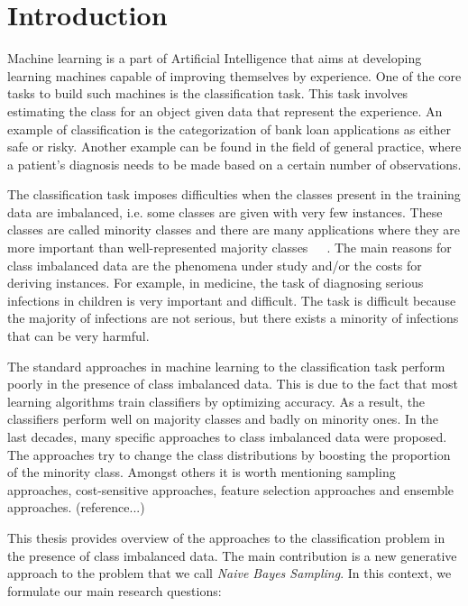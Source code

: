 \chapter{Introduction}\label{Intro}
Machine learning is a part of Artificial Intelligence that aims at developing learning machines capable of improving themselves by experience. One of the core tasks to build such machines is the classification task. This task involves estimating the class for an object given data that represent the experience.
 An example of classification is the categorization of bank loan applications as either safe or risky. Another example can be found in the field of general practice, where a patient's diagnosis needs to be made based on a certain number of observations.

The classification task imposes difficulties when the classes present in the training data are imbalanced, i.e. some classes are given with very few instances. These classes are called minority classes and there are many applications where they are more important than well-represented majority classes~\cite{miningwith04}~\cite{Drummond05Severe}~\cite{Japkowicz02classimbalance}. The main reasons for class imbalanced data are the phenomena under study and/or the costs for deriving instances.  For example, in medicine, the task of diagnosing serious infections in children is very important and difficult. The task is difficult because the majority of infections are not serious, but there exists a minority of infections that can be very harmful.

The standard approaches in machine learning to the classification task perform poorly in the presence of class imbalanced data. This is due to the fact that most learning algorithms train classifiers by optimizing accuracy. As a result, the classifiers perform well on majority classes and badly on minority ones. In the last decades, many specific approaches to class imbalanced data were proposed.  The approaches try to change the class distributions by boosting the proportion of the minority class. Amongst others it is worth mentioning sampling approaches, cost-sensitive approaches, feature selection approaches and ensemble approaches. (reference...)

This thesis provides overview of the approaches to the classification problem in the presence of class imbalanced data.  The main contribution is a new generative approach to the problem that we call \textit{Naive Bayes Sampling}.  In this context, we formulate our main research questions:

